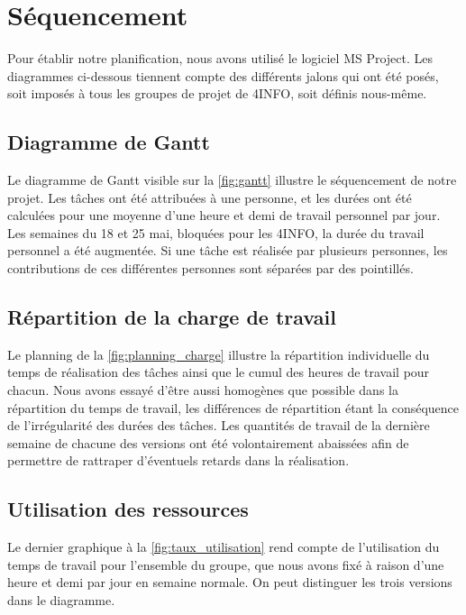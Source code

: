 \section{Séquencement}
    \label{sec:sequencement}
    Pour établir notre planification, nous avons utilisé le logiciel MS Project. Les diagrammes ci-dessous tiennent compte des différents jalons qui ont été posés, soit imposés à tous les groupes de projet de 4INFO, soit définis nous-même.

    \subsection{Diagramme de Gantt}
        Le diagramme de Gantt visible sur la \ffigure{} \ref{fig:gantt} illustre le séquencement de notre projet. Les tâches ont été attribuées à une personne, et les durées ont été calculées pour une moyenne d'une heure et demi de travail personnel par jour. Les semaines du 18 et 25 mai, bloquées pour les 4INFO, la durée du travail personnel a été augmentée. Si une tâche est réalisée par plusieurs personnes, les contributions de ces différentes personnes sont séparées par des pointillés.
    
    \subsection{Répartition de la charge de travail}
        Le planning de la \ffigure{} \ref{fig:planning_charge} illustre la répartition individuelle du temps de réalisation des tâches ainsi que le cumul des heures de travail pour chacun. Nous avons essayé d'être aussi homogènes que possible dans la répartition du temps de travail, les différences de répartition étant la conséquence de l'irrégularité des durées des tâches. Les quantités de travail de la dernière semaine de chacune des versions ont été volontairement abaissées afin de permettre de rattraper d'éventuels retards dans la réalisation.

    \subsection{Utilisation des ressources}
        Le dernier graphique à la \ffigure{} \ref{fig:taux_utilisation} rend compte de l'utilisation du temps de travail pour l'ensemble du groupe, que nous avons fixé à raison d'une heure et demi par jour en semaine normale. On peut distinguer les trois versions dans le diagramme. 

